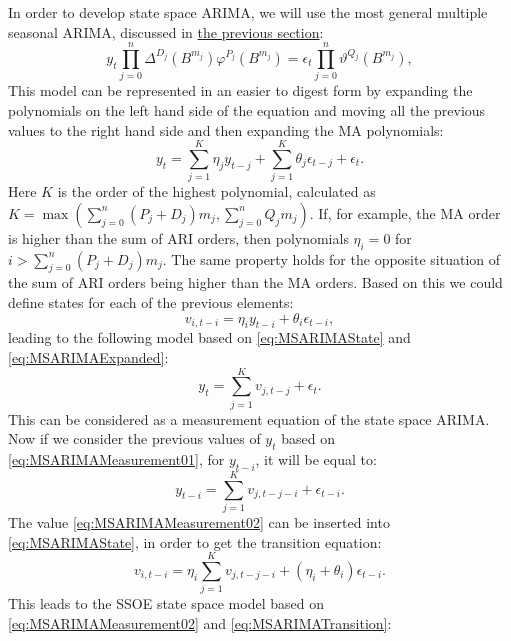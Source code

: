 \documentclass[
]{book}
\theoremstyle{definition}
\theoremstyle{definition}
\theoremstyle{definition}
\theoremstyle{definition}
\theoremstyle{remark}
\begin{document}
In order to develop state space ARIMA, we will use the most general multiple seasonal ARIMA, discussed in \protect\hyperlink{MSARIMA}{the previous section}:
\begin{equation*}
  y_t \prod_{j=0}^n \Delta^{D_j} (B^{m_j}) \varphi^{P_j}(B^{m_j}) = \epsilon_t \prod_{j=0}^n \vartheta^{Q_j}(B^{m_j}) ,
\end{equation*}
This model can be represented in an easier to digest form by expanding the polynomials on the left hand side of the equation and moving all the previous values to the right hand side and then expanding the MA polynomials:
\begin{equation}
  y_t = \sum_{j=1}^K \eta_j y_{t-j} + \sum_{j=1}^K \theta_j \epsilon_{t-j} + \epsilon_t .
  \label{eq:MSARIMAExpanded}
\end{equation}
Here \(K\) is the order of the highest polynomial, calculated as \(K=\max\left(\sum_{j=0}^n (P_j + D_j)m_j, \sum_{j=0}^n Q_j m_j\right)\). If, for example, the MA order is higher than the sum of ARI orders, then polynomials \(\eta_i=0\) for \(i>\sum_{j=0}^n (P_j + D_j)m_j\). The same property holds for the opposite situation of the sum of ARI orders being higher than the MA orders. Based on this we could define states for each of the previous elements:
\begin{equation}
  v_{i,t-i} = \eta_i y_{t-i} + \theta_i \epsilon_{t-i},
  \label{eq:MSARIMAState}
\end{equation}
leading to the following model based on \eqref{eq:MSARIMAState} and \eqref{eq:MSARIMAExpanded}:
\begin{equation}
  y_t = \sum_{j=1}^K v_{j,t-j} + \epsilon_t .
  \label{eq:MSARIMAMeasurement01}
\end{equation}
This can be considered as a measurement equation of the state space ARIMA. Now if we consider the previous values of \(y_t\) based on \eqref{eq:MSARIMAMeasurement01}, for \(y_{t-i}\), it will be equal to:
\begin{equation}
  y_{t-i} = \sum_{j=1}^K v_{j,t-j-i} + \epsilon_{t-i} .
  \label{eq:MSARIMAMeasurement02}
\end{equation}
The value \eqref{eq:MSARIMAMeasurement02} can be inserted into \eqref{eq:MSARIMAState}, in order to get the transition equation:
\begin{equation}
  v_{i,t-i} = \eta_i \sum_{j=1}^K v_{j,t-j-i} + (\eta_i + \theta_i) \epsilon_{t-i}.
  \label{eq:MSARIMATransition}
\end{equation}
This leads to the SSOE state space model based on \eqref{eq:MSARIMAMeasurement02} and \eqref{eq:MSARIMATransition}:
\end{document}
